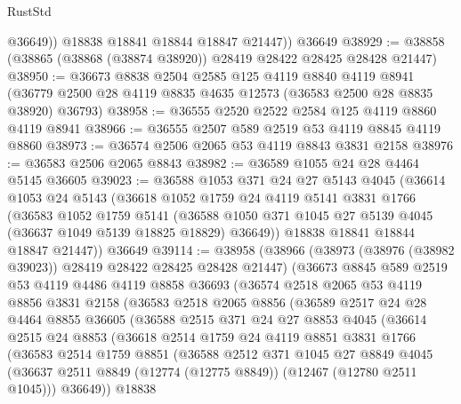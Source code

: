 \begin{lexlean}{RustStd}
\begin{coremodule}
            @36649))
        @18838
        @18841
        @18844
        @18847
        @21447))
    @36649
@38929 := @38858 (@38865 (@38868 (@38874 @38920)) @28419 @28422 @28425 @28428 @21447)
@38950 := @36673
    @8838
    @2504
    @2585
    @125
    @4119
    @8840
    @4119
    @8941
    (@36779 @2500 @28 @4119 @8835 @4635 @12573 (@36583 @2500 @28 @8835 @38920) @36793)
@38958 := @36555 @2520 @2522 @2584 @125 @4119 @8860 @4119 @8941
@38966 := @36555 @2507 @589 @2519 @53 @4119 @8845 @4119 @8860
@38973 := @36574 @2506 @2065 @53 @4119 @8843 @3831 @2158
@38976 := @36583 @2506 @2065 @8843
@38982 := @36589 @1055 @24 @28 @4464 @5145 @36605
@39023 := @36588
    @1053
    @371
    @24
    @27
    @5143
    @4045
    (@36614
      @1053
      @24
      @5143
      (@36618
        @1052
        @1759
        @24
        @4119
        @5141
        @3831
        @1766
        (@36583
          @1052
          @1759
          @5141
          (@36588 @1050 @371 @1045 @27 @5139 @4045 (@36637 @1049 @5139 @18825 @18829) @36649))
        @18838
        @18841
        @18844
        @18847
        @21447))
    @36649
@39114 := @38958
    (@38966
      (@38973 (@38976 (@38982 @39023)) @28419 @28422 @28425 @28428 @21447)
      (@36673
        @8845
        @589
        @2519
        @53
        @4119
        @4486
        @4119
        @8858
        @36693
        (@36574
          @2518
          @2065
          @53
          @4119
          @8856
          @3831
          @2158
          (@36583
            @2518
            @2065
            @8856
            (@36589
              @2517
              @24
              @28
              @4464
              @8855
              @36605
              (@36588
                @2515
                @371
                @24
                @27
                @8853
                @4045
                (@36614
                  @2515
                  @24
                  @8853
                  (@36618
                    @2514
                    @1759
                    @24
                    @4119
                    @8851
                    @3831
                    @1766
                    (@36583
                      @2514
                      @1759
                      @8851
                      (@36588
                        @2512
                        @371
                        @1045
                        @27
                        @8849
                        @4045
                        (@36637 @2511 @8849 (@12774 (@12775 @8849)) (@12467 (@12780 @2511 @1045)))
                        @36649))
                    @18838

\end{coremodule}
\end{lexlean}
